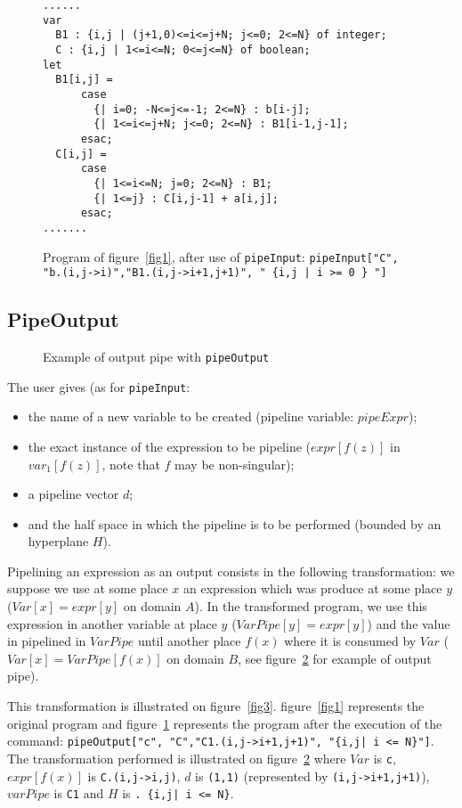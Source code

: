 \documentclass[a4paper,11pt]{article}
\begin{document}
\begin{figure}[ht]
\begin{verbatim}
......
var
  B1 : {i,j | (j+1,0)<=i<=j+N; j<=0; 2<=N} of integer;
  C : {i,j | 1<=i<=N; 0<=j<=N} of boolean;
let
  B1[i,j] = 
      case
        {| i=0; -N<=j<=-1; 2<=N} : b[i-j];
        {| 1<=i<=j+N; j<=0; 2<=N} : B1[i-1,j-1];
      esac;
  C[i,j] = 
      case
        {| 1<=i<=N; j=0; 2<=N} : B1;
        {| 1<=j} : C[i,j-1] + a[i,j];
      esac;
.......
\end{verbatim}
\caption{Program of figure~\ref{fig1}, after use of {\tt pipeInput}:
{\tt pipeInput["C", "b.(i,j->i)","B1.(i,j->i+1,j+1)",
" \{i,j | i >= 0 \} "]}}
\label{fig2}
\end{figure}

\subsection{PipeOutput}
\begin{figure}

\caption{Example of output pipe with {\tt pipeOutput}}
\label{fig02}
\end{figure}

The user gives (as for {\tt pipeInput}:
\begin{itemize}
\item the name of a new variable to be created 
 (pipeline variable: $pipeExpr$);
\item  the exact instance of 
the expression to be pipeline 
($expr[f(z)]$ in  $var_1[f(z)]$, note that $f$ may be non-singular);
\item  a pipeline vector
$d$;
\item and the half space  in which 
the pipeline is to be performed (bounded by an hyperplane $H$).
\end{itemize}

 Pipelining an expression as
an output consists in the following transformation:
 we suppose we use at some place $x$ 
an expression which  was produce at some place $y$
 ($Var[x]=expr[y]$ on domain $A$). In the transformed 
program, we use this expression in another variable  
at  place $y$ ($VarPipe[y] = expr[y]$) and the value 
in pipelined in $VarPipe$ until another place $f(x)$ where it is consumed 
by $Var$ ($Var[x] = VarPipe[f(x)]$ on domain $B$, see figure~\ref{fig02} for 
example of output pipe).


This transformation is illustrated on  figure~\ref{fig3}.
 figure~\ref{fig1} represents the original program
and figure~\ref{fig2} represents the program after the execution of 
the command:  {\tt pipeOutput["c", "C","C1.(i,j->i+1,j+1)",
"\{i,j| i <= N\}"]}. The transformation performed is illustrated on 
figure~\ref{fig02} where $Var$ is {\tt c}, $expr[f(x)]$ is {\tt C.(i,j->i,j)},
$d$ is {\tt (1,1)} (represented by {\tt (i,j->i+1,j+1)}),  $varPipe$
is {\tt C1} and $H$ is {\tt. \{i,j| i <= N\}}.
\end{document}
